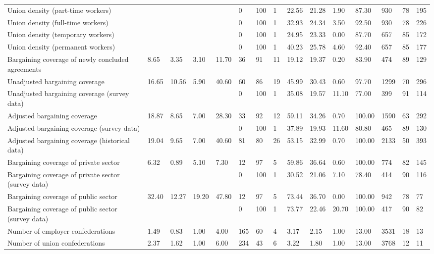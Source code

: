 \begin{longtable}{lllllllllllllll}
Union density (part-time workers) &  &  &  &  & 0 & 100 & 1 & 22.56 & 21.28 & 1.90 & 87.30 & 930 & 78 & 195\\
Union density (full-time workers) &  &  &  &  & 0 & 100 & 1 & 32.93 & 24.34 & 3.50 & 92.50 & 930 & 78 & 226\\
Union density (temporary workers) &  &  &  &  & 0 & 100 & 1 & 24.95 & 23.33 & 0.00 & 87.70 & 657 & 85 & 172\\
\addlinespace
Union density (permanent workers) &  &  &  &  & 0 & 100 & 1 & 40.23 & 25.78 & 4.60 & 92.40 & 657 & 85 & 177\\
Bargaining coverage of newly concluded agreements & 8.65 & 3.35 & 3.10 & 11.70 & 36 & 91 & 11 & 19.12 & 19.37 & 0.20 & 83.90 & 474 & 89 & 129\\
Unadjusted bargaining coverage & 16.65 & 10.56 & 5.90 & 40.60 & 60 & 86 & 19 & 45.99 & 30.43 & 0.60 & 97.70 & 1299 & 70 & 296\\
Unadjusted bargaining coverage (survey data) &  &  &  &  & 0 & 100 & 1 & 35.08 & 19.57 & 11.10 & 77.00 & 399 & 91 & 114\\
Adjusted bargaining coverage & 18.87 & 8.65 & 7.00 & 28.30 & 33 & 92 & 12 & 59.11 & 34.26 & 0.70 & 100.00 & 1590 & 63 & 292\\
\addlinespace
Adjusted bargaining coverage (survey data) &  &  &  &  & 0 & 100 & 1 & 37.89 & 19.93 & 11.60 & 80.80 & 465 & 89 & 130\\
Adjusted bargaining coverage (historical data) & 19.04 & 9.65 & 7.00 & 40.60 & 81 & 80 & 26 & 53.15 & 32.99 & 0.70 & 100.00 & 2133 & 50 & 393\\
Bargaining coverage of private sector & 6.32 & 0.89 & 5.10 & 7.30 & 12 & 97 & 5 & 59.86 & 36.64 & 0.60 & 100.00 & 774 & 82 & 145\\
Bargaining coverage of private sector (survey data) &  &  &  &  & 0 & 100 & 1 & 30.52 & 21.06 & 7.10 & 78.40 & 414 & 90 & 116\\
Bargaining coverage of public sector & 32.40 & 12.27 & 19.20 & 47.80 & 12 & 97 & 5 & 73.44 & 36.70 & 0.00 & 100.00 & 942 & 78 & 77\\
\addlinespace
Bargaining coverage of public sector (survey data) &  &  &  &  & 0 & 100 & 1 & 73.77 & 22.46 & 20.70 & 100.00 & 417 & 90 & 82\\
Number of employer confederations & 1.49 & 0.83 & 1.00 & 4.00 & 165 & 60 & 4 & 3.17 & 2.15 & 1.00 & 13.00 & 3531 & 18 & 13\\
Number of union confederations & 2.37 & 1.62 & 1.00 & 6.00 & 234 & 43 & 6 & 3.22 & 1.80 & 1.00 & 13.00 & 3768 & 12 & 11\\

\end{longtable}
